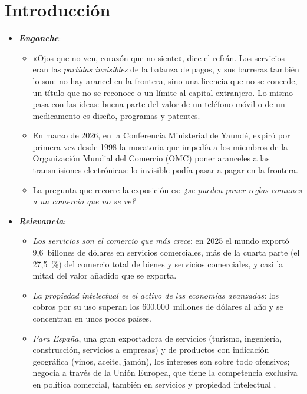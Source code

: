 \documentclass[11pt]{article}
\begin{document}
\tceetitulo

\section*{Introducción}

\begin{itemize}
\item \textbf{\emph{Enganche}}:
  \begin{itemize}
  \item «Ojos que no ven, corazón que no siente», dice el refrán. Los servicios eran las \emph{partidas invisibles} de la balanza de pagos, y sus barreras también lo son: no hay arancel en la frontera, sino una licencia que no se concede, un título que no se reconoce o un límite al capital extranjero. Lo mismo pasa con las ideas: buena parte del valor de un teléfono móvil o de un medicamento es diseño, programas y patentes.
  \item En marzo de 2026, en la Conferencia Ministerial de Yaundé, expiró por primera vez desde 1998 la moratoria que impedía a los miembros de la Organización Mundial del Comercio (OMC) poner aranceles a las transmisiones electrónicas: lo invisible podía pasar a pagar en la frontera\nocite{OMC2026CM14}.
  \item La pregunta que recorre la exposición es: \emph{¿se pueden poner reglas comunes a un comercio que no se ve?}
  \end{itemize}

\item \textbf{\emph{Relevancia}}:
  \begin{itemize}
  \item \emph{Los servicios son el comercio que más crece}: en 2025 el mundo exportó 9,6~billones de dólares en servicios comerciales, más de la cuarta parte (el 27,5~\%) del comercio total de bienes y servicios comerciales, y casi la mitad del valor añadido que se exporta\nocite{OMC2026EstadisticasServicios,OCDE2025TiVA}.
  \item \emph{La propiedad intelectual es el activo de las economías avanzadas}: los cobros por su uso superan los 600.000~millones de dólares al año y se concentran en unos pocos países\nocite{OMC2026EstadisticasServicios}.
  \item \emph{Para España}, una gran exportadora de servicios (turismo, ingeniería, construcción, servicios a empresas) y de productos con indicación geográfica (vinos, aceite, jamón), los intereses son sobre todo ofensivos; negocia a través de la Unión Europea, que tiene la competencia exclusiva en política comercial, también en servicios y propiedad intelectual .
  \end{itemize}


\end{itemize}
\end{document}
